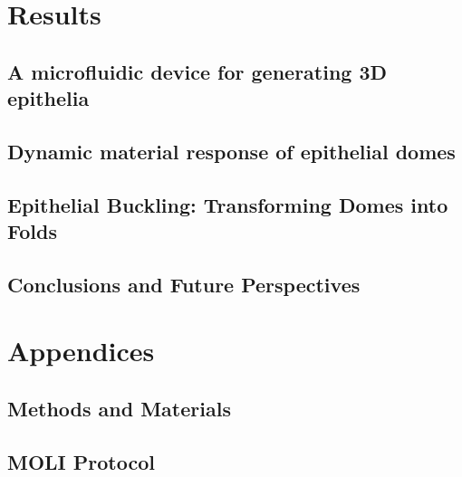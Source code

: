 \documentclass[11pt, final, a4paper, twoside, openright]{book}
\begin{document}
	\part{Results}
	\renewcommand{\thesection}{6.\arabic{section}}
	\hypertarget{a-microfluidic-system-for-generating-3d-epithelia-with-controlled-pressure-and-shape}{%
	\chapter{A microfluidic device for generating 3D epithelia}\label{a-microfluidic-system-for-generating-3d-epithelia-with-controlled-pressure-and-shape}}
	

	\renewcommand{\thesection}{7.\arabic{section}}
	\hypertarget{dynamic-material-response-of-epithelial-domes}{%
	\chapter{Dynamic material response of epithelial
	domes}\label{dynamic-material-response-of-epithelial-domes}}
	

	\renewcommand{\thesection}{8.\arabic{section}}
	\hypertarget{epithelial-buckling-transforming-domes-into-folds}{%
	\chapter{Epithelial Buckling: Transforming Domes into Folds}\label{epithelial-buckling-transforming-domes-into-folds}}
	
	
	\renewcommand{\thesection}{9.\arabic{section}}
	\hypertarget{chapter-9}{%
	\chapter{Conclusions and Future Perspectives}\label{chapter-9}}
	
	


	\part{Appendices}
	\begin{appendices}
		\renewcommand{\thesection}{A.\arabic{section}}
		\chapter{Methods and Materials}   \label{appendix_1}
		

		\renewcommand{\thesection}{B.\arabic{section}}
		\chapter{MOLI Protocol}   \label{appendix_2}
		
	\end{appendices}
	
	\backmatter
	
	
\end{document}
